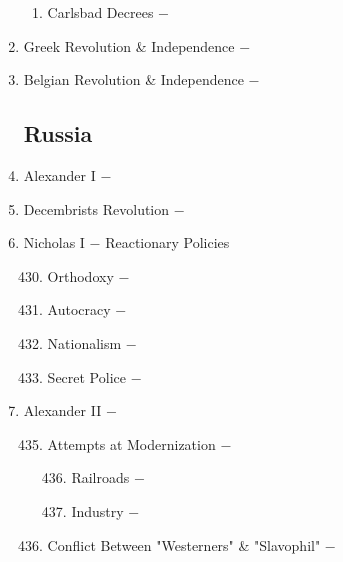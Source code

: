 \documentclass[12pt]{article}
\begin{document}
\begin{enumerate}
\begin{enumerate}[label=\arabic{*}.]
\item Carlsbad Decrees $-$

\end{enumerate}
\setcounter{enumi}{424}

\item Greek Revolution \& Independence $-$

\item Belgian Revolution \& Independence $-$

\subsection{Russia}

\item Alexander I $-$ 

\item Decembrists Revolution $-$ 

\item Nicholas I $-$ Reactionary Policies

\begin{enumerate}[label=\arabic{*}.]
\setcounter{enumii}{429}

\item Orthodoxy $-$

\item Autocracy $-$ 

\item Nationalism $-$ 

\item Secret Police $-$ 

\end{enumerate}

\setcounter{enumi}{433}

\item Alexander II $-$ 

\begin{enumerate}[label=\arabic{*}.]
\setcounter{enumii}{434}

\item Attempts at Modernization $-$

\begin{enumerate}[label=\arabic{*}.]
\setcounter{enumiii}{435}

\item Railroads $-$ 

\item Industry $-$

\end{enumerate}
\setcounter{enumii}{437}

\item Conflict Between "Westerners" \& "Slavophil" $-$


\end{enumerate}
\end{enumerate}
\end{document}
